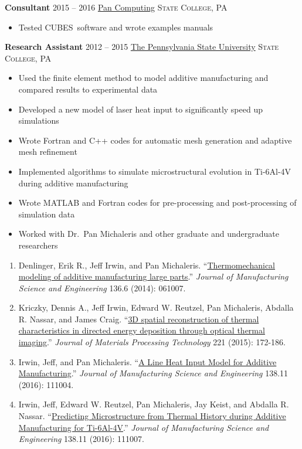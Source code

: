\documentclass[10.5pt,letterpaper]{article}
\begin{document}
\noindent \textbf{Consultant} \hfill 2015 -- 2016 \break
\href{http://www.pancomputing.com}{Pan Computing} \hfill \textsc{State College, PA}
\begin{itemize}
	\setlength{\parskip}{0em}
	\item Tested CUBES\textsuperscript\textregistered\ software and wrote examples manuals
\end{itemize}

\noindent \textbf{Research Assistant} \hfill 2012 -- 2015 \break
\href{https://www.psu.edu}{The Pennsylvania State University} \hfill \textsc{State College, PA}
\begin{itemize}
	\setlength{\parskip}{0em}
	\item Used the finite element method to model additive manufacturing and compared results to experimental data
	\item Developed a new model of laser heat input to significantly speed up simulations
	\item Wrote Fortran and C++ codes for automatic mesh generation and adaptive mesh refinement
	\item Implemented algorithms to simulate microstructural evolution in Ti-6Al-4V during additive manufacturing
	\item Wrote MATLAB and Fortran codes for pre-processing and post-processing of simulation data
	\item Worked with Dr.\ Pan Michaleris and other graduate and undergraduate researchers
\end{itemize}

\spacedhrule{0.5em}{-0.5em}

\begin{enumerate}[leftmargin=*]
	\setlength{\parskip}{0em}
	\item Denlinger, Erik R., Jeff Irwin, and Pan Michaleris. ``\href{http://manufacturingscience.asmedigitalcollection.asme.org/article.aspx?articleid=1910535}{Thermomechanical modeling of additive manufacturing large parts}.'' \emph{Journal of Manufacturing Science and Engineering} 136.6 (2014): 061007.
	\item Kriczky, Dennis A., Jeff Irwin, Edward W. Reutzel, Pan Michaleris, Abdalla R. Nassar, and James Craig. ``\href{https://www.sciencedirect.com/science/article/pii/S0924013615000643}{3D spatial reconstruction of thermal characteristics in directed energy deposition through optical thermal imaging}.'' \emph{Journal of Materials Processing Technology} 221 (2015): 172-186.
	\item Irwin, Jeff, and Pan Michaleris. ``\href{http://manufacturingscience.asmedigitalcollection.asme.org/article.aspx?articleid=2525324}{A Line Heat Input Model for Additive Manufacturing}.'' \emph{Journal of Manufacturing Science and Engineering} 138.11 (2016): 111004.
	\item Irwin, Jeff, Edward W. Reutzel, Pan Michaleris, Jay Keist, and Abdalla R. Nassar. ``\href{http://manufacturingscience.asmedigitalcollection.asme.org/article.aspx?articleid=2520839}{Predicting Microstructure from Thermal History during Additive Manufacturing for Ti-6Al-4V}.'' \emph{Journal of Manufacturing Science and Engineering} 138.11 (2016): 111007.
\end{enumerate}
\end{document}
